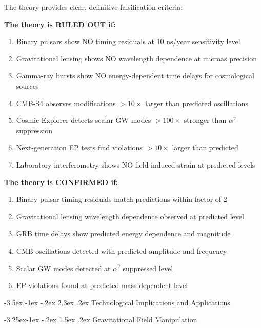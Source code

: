 \documentclass[10pt,twocolumn]{article}
\makeatletter
\renewcommand\section{\@startsection{section}{1}{\z@}%
  {-3.5ex \@plus -1ex \@minus -.2ex}%
  {2.3ex \@plus.2ex}%
  {\normalfont\large\bfseries}}
\renewcommand\subsection{\@startsection{subsection}{2}{\z@}%
  {-3.25ex\@plus -1ex \@minus -.2ex}%
  {1.5ex \@plus .2ex}%
  {\normalfont\normalsize\bfseries}}
\makeatother
\begin{document}
\vspace{0.5em}
The theory provides clear, definitive falsification criteria:

\textbf{The theory is RULED OUT if:}
\begin{enumerate}
\item Binary pulsars show NO timing residuals at 10 ns/year sensitivity level
\item Gravitational lensing shows NO wavelength dependence at microas precision
\item Gamma-ray bursts show NO energy-dependent time delays for cosmological sources
\item CMB-S4 observes modifications $>10\times$ larger than predicted oscillations
\item Cosmic Explorer detects scalar GW modes $>100\times$ stronger than $\alpha^2$ suppression
\item Next-generation EP tests find violations $>10\times$ larger than predicted
\item Laboratory interferometry shows NO field-induced strain at predicted levels
\end{enumerate}

\textbf{The theory is CONFIRMED if:}
\begin{enumerate}
\item Binary pulsar timing residuals match predictions within factor of 2
\item Gravitational lensing wavelength dependence observed at predicted level
\item GRB time delays show predicted energy dependence and magnitude
\item CMB oscillations detected with predicted amplitude and frequency
\item Scalar GW modes detected at $\alpha^2$ suppressed level
\item EP violations found at predicted mass-dependent level
\end{enumerate}


\section{Technological Implications and Applications}

\vspace{0.5em}
\subsection{Gravitational Field Manipulation}
\end{document}
